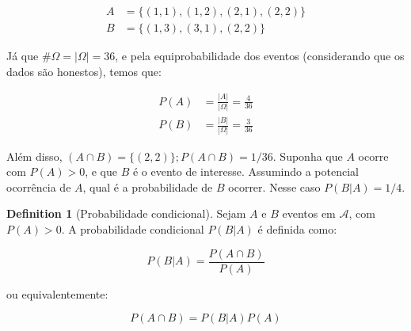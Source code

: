 \documentclass[
]{article}
\theoremstyle{definition}
\newtheorem{definition}{Definition}[section]
\theoremstyle{definition}
\theoremstyle{definition}
\theoremstyle{definition}
\theoremstyle{remark}
\begin{document}
\begin{align*}
A &= \{(1,1),(1,2),(2,1),(2,2)\} \\
B &= \{(1,3),(3,1),(2,2)\}
\end{align*}

Já que \(\#\Omega = |\Omega| = 36\), e pela equiprobabilidade dos eventos (considerando que os dados são honestos), temos que:

\begin{align*}
P(A) &= \frac{|A|}{|\Omega|} = \frac{4}{36} \\
P(B) &= \frac{|B|}{|\Omega|} = \frac{3}{36}
\end{align*}

Além disso, \((A \cap B) = \{(2,2)\}; P(A \cap B) = 1/36\). Suponha que \(A\) ocorre com \(P(A) > 0\), e que \(B\) é o evento de interesse. Assumindo a potencial ocorrência de \(A\), qual é a probabilidade de \(B\) ocorrer. Nesse caso \(P(B|A) = 1/4\).

\begin{definition}[Probabilidade condicional]
Sejam \(A\) e \(B\) eventos em \(\mathcal{A}\), com \(P(A) > 0\). A probabilidade condicional \(P(B|A)\) é definida como:

\begin{equation}
P(B|A) = \frac{P(A \cap B)}{P(A)}
\label{eq:probcond}
\end{equation}

ou equivalentemente:

\begin{equation}
P(A \cap B) = P(B|A)P(A)
\label{eq:probconddif}
\end{equation}
\end{definition}
\end{document}
